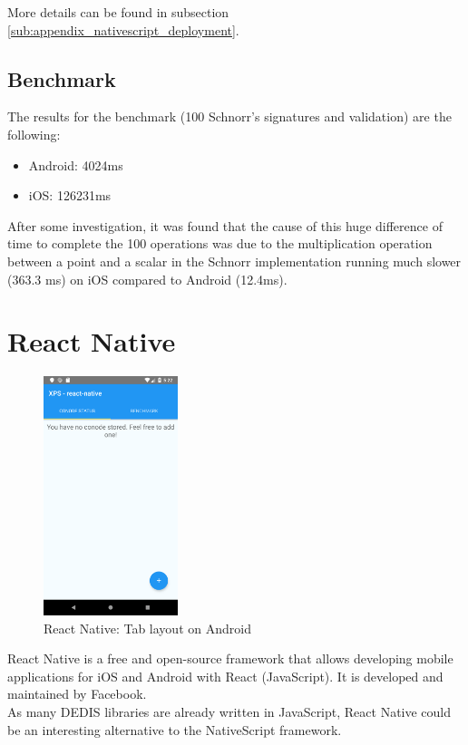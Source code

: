 \documentclass[11pt, a4paper, twoside, openright]{article} %
\begin{document}
{More details can be found in subsection \ref{sub:appendix_nativescript_deployment}.



\subsection{Benchmark}
The results for the benchmark (100 Schnorr's signatures and validation) are the following:
\begin{itemize}
	\item Android: 4024ms
	\item iOS: 126231ms
\end{itemize}

After some investigation, it was found that the cause of this huge difference of time to complete the 100 operations was due to the multiplication operation between a point and a scalar in the Schnorr implementation running much slower (363.3 ms) on iOS compared to Android (12.4ms). \\

\newpage
\section{React Native}

\begin{figure}[!htb]
	\centering
	\includegraphics[width=0.35\textwidth]{img/react_layout_android.png}
	
	\caption{React Native: Tab layout on Android}
	\label{fig:react_layout}
\end{figure}

React Native is a free and open-source framework that allows developing mobile applications for iOS and Android with React (JavaScript). It is developed and maintained by Facebook.\\
As many DEDIS libraries are already written in JavaScript, React Native could be an interesting alternative to the NativeScript framework.\\

}
\end{document}

